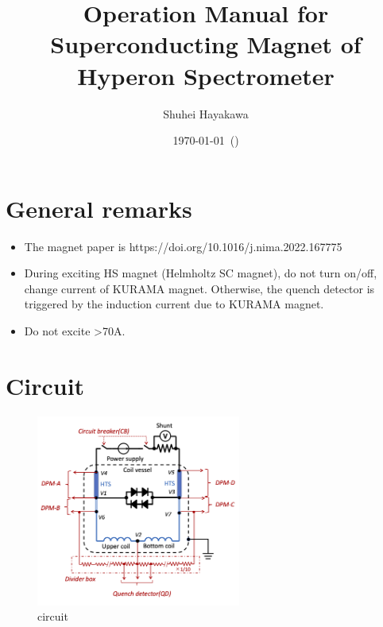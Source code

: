 \documentclass[a4paper,12pt]{article}
\title{\textbf{Operation Manual for Superconducting Magnet of Hyperon Spectrometer}}
\author{Shuhei Hayakawa}
\date{\today\ (\version)}
\begin{document}
\maketitle

\section{General remarks}

\begin{itemize}
 \item The magnet paper is https://doi.org/10.1016/j.nima.2022.167775
 \item During exciting HS magnet (Helmholtz SC magnet), do not turn on/off, change current of KURAMA magnet. Otherwise, the quench detector is triggered by the induction current due to KURAMA magnet.
 \item Do not excite >70A.
\end{itemize}

\section{Circuit}

\begin{figure}[htbp]
  \centering
  \includegraphics[width=0.6\textwidth]{fig/circuit.png}
  \caption{circuit}
  \label{fig:circuit}
\end{figure}

\end{document}
